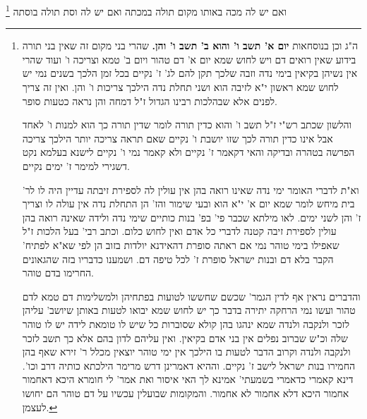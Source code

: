 \documentclass[12pt, openany]{book}
\newcommand{\footnotecomment}[1]{\footnote{#1}}
\newcommand{\commenta}[1]{\footnotecomment{#1}}
\begin{document}
{ואם יש לה מכה באותו מקום תולה במכתה ואם יש לה וסת תולה בוסתה 
\commenta{ה"ג וכן בנוסחאות \textbf{יום א' תשב ו' והוא ב' תשב ו' והן.}  שהרי בני מקום זה שאין בני תורה בידוע שאין רואים דם ויש לחוש שמא יום א' דם טהור ויום ב' טמא וצריכה ו' ועוד שהרי אין נשיהן בקיאין בימי נדה וזבה שלכך תקן להם לג' ז' נקיים בכל זמן הלכך בשנים נמי יש לחוש שמא ראשון י"א לזיבה הוא ושני תחלת נדה הילכך צריכות ו' והן. ואין זה צריך לפנים אלא שבהלכות רבינו הגדול ז"ל דמחה והן נראה כטעות סופר.\par  והלשון שכתב רש"י ז"ל תשב ו' והוא כדין תורה לומר שדין תורה כך הוא למנות ו' לאחד אבל אינו כדין תורה לכך שזו יושבת ו' נקיים שאם תראה צריכה יותר הילכך צריכה הפרשה בטהרה ובדיקה והאי דקאמר ז' נקיים ולא קאמר נמי ו' נקיים לישנא בעלמא נקט דשגירי למימר ז' ימים נקיים.\par  וא"ת לדברי האומר ימי נדה שאינו רואה בהן אין עולין לה לספירת זיבתה עדיין היה לו לר' בית מיחש לומר שמא יום א' י"א הוא ובעי שימור והז' הן התחלת נדה אין עולה לו וצריך ז' והן לשני ימים. לאו מילתא שכבר פי' בפ' בנות כותיים שימי נדה ולידה שאינה רואה בהן עולין לספירת זיבה קטנה לדברי כל אדם ואין לחוש כלום. וכתב רבי' בעל הלכות ז"ל שאפילו בימי טוהר נמי אם ראתה סופרת דהאידנא יולדות בזוב הן לפי שא"א לפתיח' הקבר בלא דם ובנות ישראל סופרת ז' לכל טיפה דם. ושמענו כדבריו בזה שהגאונים החרימו בדם טוהר.\par  והדברים נראין אף לדין הגמר' שכשם שחששו לטועות בפתחיהן ולמשלימות דם טמא לדם טהור ועשו נמי הרחקה יתירה בדבר כך יש לחוש שמא יבואו לטעות באותן שיושב' עליהן לזכר ולנקבה ולנדה שמא ינהגו בהן קולא שסוברות כל שיש לו טומאת לידה יש לו טוהר שלה וכ"ש שברוב נפלים אין בני אדם בקיאין. ואין עליהם לדון בהם אלא כך תשב לזכר ולנקבה ולנדה וקרוב הדבר לטעות בו הילכך אין ימי טוהר יוצאין מכלל ר' זירא שאף בהן החמירו בנות ישראל לישב ז' נקיים. וההיא דאמרינן דרש מרימר הילכתא כותיה דרב וכו'. דינא קאמרי כדאמרי בשמעתי' אמינא לך האי איסור ואת אמר' לי חומרא היכא דאחמור אחמור היכא דלא אחמור לא אחמור. והמקומות שבועלין עכשיו על דם טוהר הם יחושו לעצמן. }

}
\end{document}
